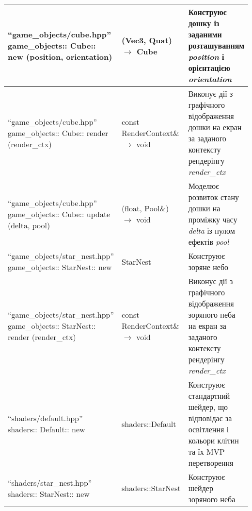 \begin{longtable}{| C{6cm} | C{4cm} | C{5cm} |}
  \hline
  ``game_objects/cube.hpp'' \newline game_objects:: \newline Cube:: \newline
  new \newline (position, orientation)
  & (Vec3, Quat) $\to$ Cube
  & Конструює дошку із заданими розташуванням \emph{position} і орієнтацією \emph{orientation} \\
  \hline
  ``game_objects/cube.hpp'' \newline game_objects:: \newline Cube:: \newline
  render \newline (render_ctx)
  & const RenderContext\& $\to$ void
  & Виконує дії з графічного відображення дошки на екран
  за заданого контексту рендерінгу \emph{render_ctx} \\
  \hline
  ``game_objects/cube.hpp'' \newline game_objects:: \newline Cube:: \newline
  update \newline (delta, pool)
  & (float, Pool\&) $\to$ void
  & Моделює розвиток стану дошки на проміжку часу \emph{delta} із пулом ефектів \emph{pool} \\

  \hline
  ``game_objects/star_nest.hpp'' \newline game_objects:: \newline StarNest:: \newline
  new
  & StarNest
  & Конструює зоряне небо \\
  \hline
  ``game_objects/star_nest.hpp'' \newline game_objects:: \newline StarNest:: \newline
  render \newline (render_ctx)
  & const RenderContext\& $\to$ void
  & Виконує дії з графічного відображення зоряного неба на екран
  за заданого контексту рендерінгу \emph{render_ctx} \\

  \hline
  ``shaders/default.hpp'' \newline shaders:: \newline Default:: \newline
  new
  & shaders::Default
  & Конструює стандартний шейдер, що відповідає за освітлення
  і кольори клітин та їх MVP перетворення \\
  \hline
  ``shaders/star_nest.hpp'' \newline shaders:: \newline StarNest:: \newline
  new
  & shaders::StarNest
  & Конструює шейдер зоряного неба \\


\end{longtable}
